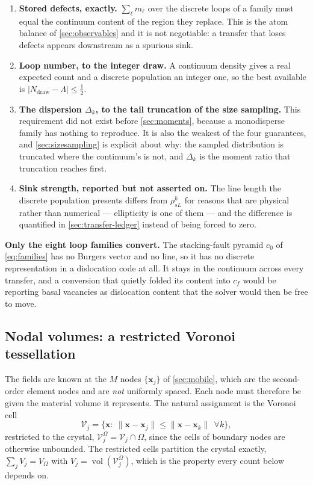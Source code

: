 \documentclass{article}
\begin{document}
\begin{enumerate}
\item \textbf{Stored defects, exactly.} $\sum_\ell m_\ell$ over the discrete
      loops of a family must equal the continuum content of the region they
      replace. This is the atom balance of \cref{sec:observables} and it is not
      negotiable: a transfer that loses defects appears downstream as a spurious
      sink.
\item \textbf{Loop number, to the integer draw.} A continuum density gives a
      real expected count and a discrete population an integer one, so the best
      available is $|N_{\mathrm{draw}}-\Lambda|\le\tfrac12$.
\item \textbf{The dispersion $\Delta_k$, to the tail truncation of the size
      sampling.} This requirement did not exist before \cref{sec:moments},
      because a monodisperse family has nothing to reproduce. It is also the
      weakest of the four guarantees, and \cref{sec:sizesampling} is explicit
      about why: the sampled distribution is truncated where the continuum's is
      not, and $\Delta_k$ is the moment ratio that truncation reaches first.
\item \textbf{Sink strength, reported but not asserted on.} The line length the
      discrete population presents differs from $\rho^k_{sL}$ for reasons that
      are physical rather than numerical --- ellipticity is one of them --- and
      the difference is quantified in \cref{sec:transfer-ledger} instead of being
      forced to zero.
\end{enumerate}

\textbf{Only the eight loop families convert.} The stacking-fault pyramid $c_0$
of \cref{eq:families} has no Burgers vector and no line, so it has no discrete
representation in a dislocation code at all. It stays in the continuum across
every transfer, and a conversion that quietly folded its content into $c_f$
would be reporting basal vacancies as dislocation content that the solver would
then be free to move.

\subsection{Nodal volumes: a restricted Voronoi tessellation}
\label{sec:nodalvolumes}

The fields are known at the $M$ nodes $\{\bm x_j\}$ of \cref{sec:mobile}, which
are the second-order element nodes and are \emph{not} uniformly spaced. Each node
must therefore be given the material volume it represents. The natural assignment
is the Voronoi cell
\begin{equation}
  \mathcal V_j=\bigl\{\bm x:\ \|\bm x-\bm x_j\|\le\|\bm x-\bm x_k\|\ \ \forall k\bigr\},
  \label{eq:voronoi}
\end{equation}
restricted to the crystal, $\mathcal V^\Omega_j=\mathcal V_j\cap\Omega$, since
the cells of boundary nodes are otherwise unbounded. The restricted cells
partition the crystal exactly, $\sum_jV_j=V_\Omega$ with
$V_j=\operatorname{vol}(\mathcal V^\Omega_j)$, which is the property every count
below depends on.
\end{document}
